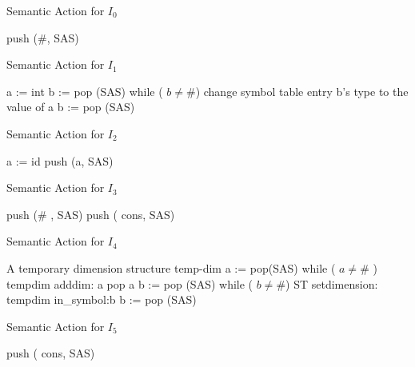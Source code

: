 \documentclass[11pt]{article}
\begin{document}
\begin{algorithm}
\caption{ Semantic Action for $I_0$}
\label{alg:I0}
\begin{algorithmic}
\STATE push (\#, SAS)

\end{algorithmic}
\end{algorithm}

\begin{algorithm}
\caption{ Semantic Action for $I_1$}
\label{alg:I1}
\begin{algorithmic}
\STATE a := int
\STATE b := pop (SAS)
\STATE while ( $b \neq \#$)
\STATE \hspace {0.5 cm} change symbol table entry b's type to the value of a 
\STATE \hspace {0.5 cm} b := pop (SAS)

\end{algorithmic}
\end{algorithm}

\begin{algorithm}
\caption{ Semantic Action for $I_2$}
\label{alg:I2}
\begin{algorithmic}
\STATE a := id 
\STATE push (a, SAS)

\end{algorithmic}
\end{algorithm}


\begin{algorithm}
\caption{ Semantic Action for $I_3$}
\label{alg: I3}
\begin{algorithmic}
\STATE push (\# , SAS)
\STATE push ( cons, SAS)

\end{algorithmic}
\end{algorithm}


\begin{algorithm}
\caption{ Semantic Action for $I_4$}
\label{alg: I4}
\begin{algorithmic}
\REQUIRE A temporary dimension structure temp-dim
\STATE a := pop(SAS)
\STATE while ( $a \neq \#$ )
\STATE \hspace {0.5 cm} tempdim adddim: a
\STATE \hspace{0.5 cm} pop a
\STATE b := pop (SAS)
\STATE while ( $b \neq \#$)
\STATE \hspace {0.5 cm} ST setdimension: tempdim in\_symbol:b
\STATE \hspace {0.5 cm} b := pop (SAS)
\end{algorithmic}
\end{algorithm}

\begin{algorithm}
\caption{ Semantic Action for $I_5$}
\label{alg: I5}
\begin{algorithmic}
\STATE push ( cons, SAS)

\end{algorithmic}
\end{algorithm}
\end{document}
